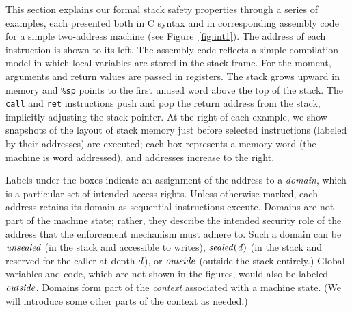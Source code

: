 \documentclass[acmsmall,review,anonymous]{acmart}\settopmatter{printfolios=true,printccs=false,printacmref=false}
\begin{document}
This section explains our formal stack safety properties through a series
of examples, each presented both in C syntax and in corresponding assembly code for a
simple two-address machine (see Figure~\ref{fig:int1}).
The address of each instruction is shown to its left.
The assembly code reflects a simple compilation model in which
local variables are stored in the stack frame.
For the moment, arguments and return values are passed in registers.
The stack grows upward in
memory and {\tt \%sp} points to the first unused word above the top of the stack.
The {\tt call} and {\tt ret} instructions push and pop the return address from the stack,
implicitly adjusting the stack pointer.
At the right of each example, we show snapshots of the layout of stack memory just before
selected instructions (labeled by their addresses) are executed; each box represents a memory word
(the machine is word addressed), and addresses increase to the right.

Labels under the boxes indicate an assignment of the address to a
{\em domain}, which is a particular set of intended access
rights. Unless otherwise marked, each address retains its domain as
sequential instructions execute. %
Domains are not part of the machine state; rather, they
describe the intended security role of the address
that the enforcement mechanism must adhere to. Such a domain
can be \(\mathit{unsealed}\) (in the stack and accessible to writes), \(\mathit{sealed(d)}\)
(in the stack and reserved for the caller at depth \(d\)), or \(\mathit{outside}\)
(outside the stack entirely.)
Global variables and code, which are not shown in the figures, would
also be labeled \(\mathit{outside}\).  
Domains form part of the {\em context} associated with a machine state.
(We will introduce some other parts of the context as needed.)
\end{document}
